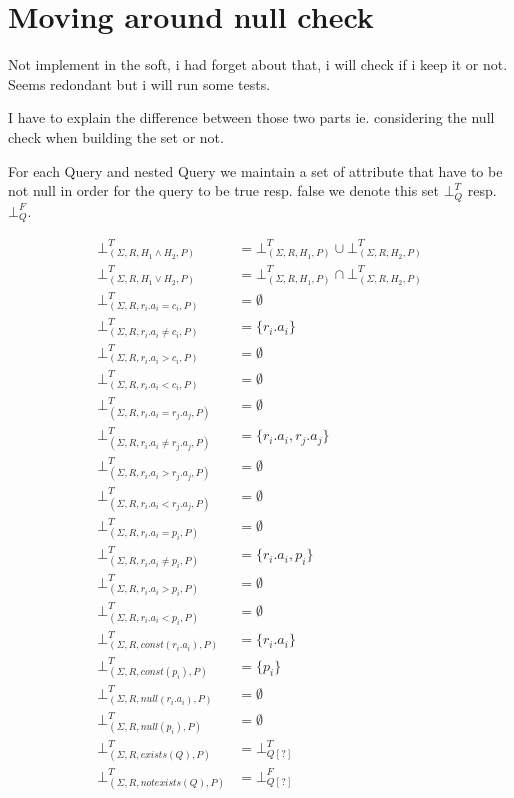 \section{Moving around null check}
Not implement in the soft, i had forget about that, i will check if i keep it or not.
Seems redondant but i will run some tests.

I have to explain the difference between those two parts ie. considering the null check when building the set or not.

\begin{mydef}
For each Query and nested Query we maintain a set of attribute that have to be not null in order for the query to be true resp. false we denote this set $\bot^T_{Q}$ resp.$\bot^F_{Q}$.
\end{mydef}

\begin{mydef}
	\begin{align*}
		\bot^T_{(\Sigma,R,H_1 \land H_2,P)} & = \bot^T_{(\Sigma,R,H_1,P)} \cup \bot^T_{(\Sigma,R,H_2,P)} \\
		\bot^T_{(\Sigma,R,H_1 \lor H_2,P)} & = \bot^T_{(\Sigma,R,H_1,P)} \cap \bot^T_{(\Sigma,R,H_2,P)} \\
		\bot^T_{(\Sigma,R,r_i.a_i = c_i,P)} & = \emptyset \\
		\bot^T_{(\Sigma,R,r_i.a_i \neq c_i,P)} & = \{r_i.a_i\} \\
		\bot^T_{(\Sigma,R,r_i.a_i > c_i,P)} & = \emptyset \\
		\bot^T_{(\Sigma,R,r_i.a_i < c_i,P)} & = \emptyset \\
		\bot^T_{(\Sigma,R,r_i.a_i = r_j.a_j,P)} & = \emptyset \\
		\bot^T_{(\Sigma,R,r_i.a_i \neq r_j.a_j,P)} & = \{r_i.a_i,r_j.a_j\}\\
		\bot^T_{(\Sigma,R,r_i.a_i > r_j.a_j,P)} & = \emptyset \\
		\bot^T_{(\Sigma,R,r_i.a_i < r_j.a_j,P)} & = \emptyset \\
		\bot^T_{(\Sigma,R,r_i.a_i = p_i,P)} & = \emptyset \\
		\bot^T_{(\Sigma,R,r_i.a_i \neq p_i,P)} & = \{r_i.a_i,p_i\} \\
		\bot^T_{(\Sigma,R,r_i.a_i > p_i,P)} & = \emptyset \\
		\bot^T_{(\Sigma,R,r_i.a_i < p_i,P)} & = \emptyset \\
		\bot^T_{(\Sigma,R,const(r_i.a_i),P)} & = \{r_i.a_i\} \\
		\bot^T_{(\Sigma,R,const(p_i),P)} & = \{p_i\} \\
		\bot^T_{(\Sigma,R,null(r_i.a_i),P)} & = \emptyset \\
		\bot^T_{(\Sigma,R,null(p_i),P)} & = \emptyset \\
		\bot^T_{(\Sigma,R,exists(Q),P)} & = \bot^T_{Q[?]} \\
		\bot^T_{(\Sigma,R,notexists(Q),P)} & = \bot^F_{Q[?]}\\
	\end{align*}
	

\end{mydef}

